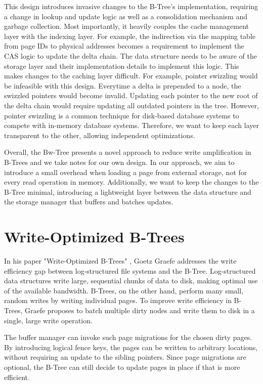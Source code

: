 This design introduces invasive changes to the B-Tree's implementation, requiring a change in lookup and update logic as well as a consolidation mechanism and garbage collection. 
Most importantly, it heavily couples the cache management layer with the indexing layer.
For example, the indirection via the mapping table from page IDs to physical addresses becomes a requirement to implement the \ac{CAS} logic to update the delta chain.
The data structure needs to be aware of the storage layer and their implementation details to implement this logic.
This makes changes to the caching layer difficult. 
For example, pointer swizzling \cite{graefe2014memory} would be infeasible with this design. 
Everytime a delta is prepended to a node, the swizzled pointers would become invalid.
Updating each pointer to the new root of the delta chain would require updating all outdated pointers in the tree.
However, pointer swizzling is a common technique for disk-based database systems \cite{leis2018leanstore} to compete with in-memory database systems.
Therefore, we want to keep each layer transparent to the other, allowing independent optimizations.

Overall, the Bw-Tree presents a novel approach to reduce write amplification in B-Trees and we take notes for our own design.
In our approach, we aim to introduce a small overhead when loading a page from external storage, not for every read operation in memory.
Additionally, we want to keep the changes to the B-Tree minimal, introducing a lightweight layer between the data structure and the storage manager that buffers and batches updates.   

\section{Write-Optimized B-Trees}
In his paper "Write-Optimized B-Trees" \cite{graefe2004write}, Goetz Graefe addresses the write efficiency gap between log-structured file systems and the B-Tree.
Log-structured data structures write large, sequential chunks of data to disk, making optimal use of the available bandwidth.
B-Trees, on the other hand, perform many small, random writes by writing individual pages.
To improve write efficiency in B-Trees, Graefe proposes to batch multiple dirty nodes and write them to disk in a single, large write operation.

The buffer manager can invoke such page migrations for the chosen dirty pages.
By introducing logical fence keys, the pages can be written to arbitrary locations, without requiring an update to the sibling pointers.
Since page migrations are optional, the B-Tree can still decide to update pages in place if that is more efficient.

